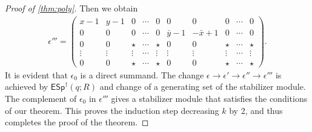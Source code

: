\documentclass[aps,pra,
floatfix,notitlepage,
nofootinbib,
longbibliography,11pt]{revtex4-1}
\theoremstyle{definition}
\newcommand{\ESp}{{\mathsf{ESp}^\dagger}}
\begin{document}
\begin{proof}[Proof of \cref{thm:poly}]
Then we obtain
\begin{align}
\epsilon''' = \begin{pmatrix}
x - 1 & y-1 &  0 & \cdots & 0 & 0 & 0 & 0 &\cdots & 0 \\
0 & 0 &        0 &\cdots & 0& \bar y - 1 & -\bar x + 1 & 0 &\cdots & 0\\
0     & 0   &  \star & \cdots &\star & 0 & 0 & \star & \cdots & \star\\
\vdots&\vdots& \vdots & \cdots &\vdots & \vdots & \vdots & \vdots & \cdots& \vdots\\
0     & 0   &  \star & \cdots &\star & 0 & 0 & \star & \cdots & \star
\end{pmatrix}. \label{eq:eps4}
\end{align}
It is evident that $\epsilon_0$ is a direct summand.
The change $\epsilon \to \epsilon' \to \epsilon'' \to \epsilon'''$
is achieved by $\ESp(q;R)$ and change of a generating set of the stabilizer module.
The complement of $\epsilon_0$ in $\epsilon'''$
gives a stabilizer module that satisfies the conditions of our theorem.
This proves the induction step decreasing $k$ by 2,
and thus completes the proof of the theorem.
\end{proof}
\end{document}
